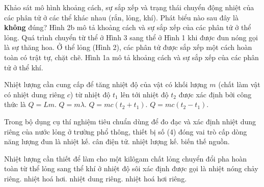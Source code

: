 \begin{ex}%
	Khảo sát mô hình khoảng cách, sự sắp xếp và trạng thái chuyển động nhiệt của các phân tử ở các thể khác nhau (rắn, lỏng, khí). Phát biểu nào sau đây là \textbf{không} đúng?
	\choice
	{Hình 2b mô tả khoảng cách và sự sắp xếp của các phân tử ở thể lỏng.}
	{Quá trình chuyển từ thể ở Hình 3 sang thể ở Hình 1 khi được đun nóng gọi là sự thăng hoa.}
	{\True Ở thể lỏng (Hình 2), các phân tử được sắp xếp một cách hoàn toàn có trật tự, chặt chẽ.}
	{Hình 1a mô tả khoảng cách và sự sắp xếp của các phân tử ở thể khí.}
\end{ex}

\begin{ex}%
	Nhiệt lượng cần cung cấp để tăng nhiệt độ của vật có khối lượng $m$ (chất làm vật có nhiệt dung riêng $c$) từ nhiệt độ $t_1$ lên tới nhiệt độ $t_2$ được xác định bởi công thức là
	\choice
	{$Q=Lm$.}
	{$Q=m\lambda$.}
	{$Q=mc(t_2+t_1)$.}
	{\True $Q=mc(t_2-t_1)$.}
\end{ex}

\begin{ex}%
	Trong bộ dụng cụ thí nghiệm tiêu chuẩn dùng để đo đạc và xác định nhiệt dung riêng của nước lỏng ở trường phổ thông, thiết bị số (4) đóng vai trò cấp dòng năng lượng đun là
	\choice
	{nhiệt kế.}
	{cân điện tử.}
	{nhiệt lượng kế.}
	{\True biến thế nguồn.}
\end{ex}

\begin{ex}%
	Nhiệt lượng cần thiết để làm cho một kilôgam chất lỏng chuyển đổi pha hoàn toàn từ thể lỏng sang thể khí ở nhiệt độ sôi xác định được gọi là
	\choice
	{nhiệt nóng chảy riêng.}
	{nhiệt hoá hơi.}
	{nhiệt dung riêng.}
	{\True nhiệt hoá hơi riêng.}
\end{ex}

